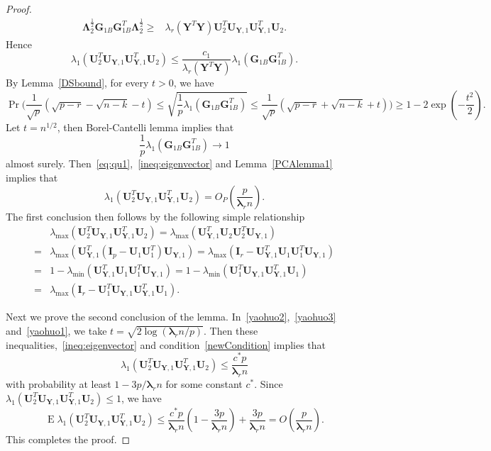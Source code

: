 \documentclass[12pt]{article} %
\DeclareMathOperator{\myE}{E}
\newcommand{\bY}{\mathbf{Y}}
\newcommand{\bG}{\mathbf{G}}
\newcommand{\bI}{\mathbf{I}}
\newcommand{\bU}{\mathbf{U}}
\newcommand{\bfsym}[1]{\ensuremath{\boldsymbol{#1}}}
\def\blambda {\bfsym {\lambda}}
\def\bLambda {\bfsym {\Lambda}}
\theoremstyle{definition}
\begin{document}
\begin{appendices}
\begin{proof}
$$\begin{aligned}
 \bLambda_{2}^{\frac{1}{2}}\bG_{1B} \bG_{1B}^T  \bLambda_{2}^{\frac{1}{2}}
\geq&
    \lambda_r(\bY^T \bY) \bU_{2}^T \bU_{\bY,1}\bU_{\bY,1}^T \bU_{2}.
\end{aligned}
$$
Hence
    \begin{equation}\label{ineq:eigenvector}
\lambda_{1}(\bU_{2}^T \bU_{\bY,1} \bU_{\bY,1}^T \bU_{2})\leq
\frac{c_1}{\lambda_r(\bY^T \bY)} \lambda_{1}
(\bG_{1B} \bG_{1B}^T).
    \end{equation}
    By Lemma~\ref{DSbound}, for every $t>0$, we have
    \begin{equation}\label{yaohuo1}
        \Pr\Big(\frac{1}{\sqrt{p}}(\sqrt{p-r}-\sqrt{n-k}-t) \leq \sqrt{\frac{1}{p}{\lambda_1(\bG_{1B}\bG_{1B}^T)} }\leq \frac{1}{\sqrt{p}}(\sqrt{p-r}+\sqrt{n-k}+t) \Big) 
   \geq 1-2\exp(-\frac{t^2}{2}).
    \end{equation}
    Let $t=n^{1/2}$, then Borel-Cantelli lemma implies that 
    \begin{equation}\label{eq:qu1}
    \frac{1}{p}\lambda_1(\bG_{1B}\bG_{1B}^T)\to 1
    \end{equation}
    almost surely.
    Then~\eqref{eq:qu1},~\eqref{ineq:eigenvector} and Lemma~\ref{PCAlemma1} implies that
    $$\lambda_{1}(\bU_{2}^T \bU_{\bY,1} \bU_{\bY,1}^T \bU_{2})=O_P(\frac{p}{\blambda_r n}).
    $$
 The first conclusion then follows by the following simple relationship
$$
\begin{aligned}
&\lambda_{\max}(\bU_{2}^T \bU_{\bY,1} \bU_{\bY,1}^T \bU_{2})
=
\lambda_{\max}(\bU_{\bY,1}^T \bU_{2} \bU_{2}^T \bU_{\bY,1})\\
=&
    \lambda_{\max}(\bU_{\bY,1}^T (\bI_p-\bU_{1} \bU_{1}^T) \bU_{\bY,1})
    =
\lambda_{\max}(\bI_r-\bU_{\bY,1}^T\bU_{1} \bU_{1}^T \bU_{\bY,1})\\
=&
1-\lambda_{\min}(\bU_{\bY,1}^T\bU_{1} \bU_{1}^T \bU_{\bY,1})
=
1-\lambda_{\min}( \bU_{1}^T \bU_{\bY,1}\bU_{\bY,1}^T\bU_{1})\\
=&
\lambda_{\max}(\bI_r-\bU_{1}^T \bU_{\bY,1}\bU_{\bY,1}^T\bU_{1}).
\end{aligned}
$$

Next we prove the second conclusion of the lemma.
In~\eqref{yaohuo2},~\eqref{yaohuo3} and~\eqref{yaohuo1}, we take $t=\sqrt{2\log(\blambda_r n/p)}$.
Then these inequalities,~\eqref{ineq:eigenvector} and condition~\eqref{newCondition} implies that
$$
\lambda_{1}(\bU_{2}^T \bU_{\bY,1} \bU_{\bY,1}^T \bU_{2})\leq
\frac{c^*p}{\blambda_r n}
$$
with probability at least $1-3p/\blambda_r n$ for some constant $c^*$.
Since $\lambda_{1}(\bU_{2}^T \bU_{\bY,1} \bU_{\bY,1}^T \bU_{2})\leq 1$, we have
$$
\myE\lambda_{1}(\bU_{2}^T \bU_{\bY,1} \bU_{\bY,1}^T \bU_{2})\leq
\frac{c^* p}{\blambda_r n}(1-\frac{3p}{\blambda_r n})
+\frac{3p}{\blambda_r n}=O(\frac{p}{\blambda_r n}).
$$
This completes the proof.
\end{proof}


\end{appendices}
\end{document}
